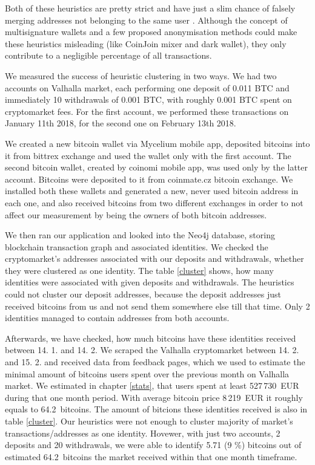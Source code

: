 \documentclass[
  digital, %
  table,   %
  lof,     %
  lot,     %
  oneside
]{fithesis3}
\begin{document}
Both of these heuristics are pretty strict and have just a slim chance of falsely merging
addresses not belonging to the same user \parencite{androulaki2013evaluating}.
Although the concept of multisignature wallets and a few proposed anonymisation methods could make
these heuristics misleading (like CoinJoin mixer and dark wallet), they only contribute to a 
negligible percentage of all transactions.

We measured the success of heuristic clustering in two ways.
We had two accounts on Valhalla market, each performing one deposit of 0.011 BTC and immediately 10 withdrawals of
0.001 BTC, with roughly 0.001 BTC spent on cryptomarket fees.
For the first account, we performed these transactions on January 11th 2018, for the second one on February 13th 2018.

We created a new bitcoin wallet via Mycelium mobile app, deposited bitcoins into it
from bittrex exchange and used the wallet only with the first account.
The second bitcoin wallet, created by coinomi mobile app, was used only by the latter account. 
Bitcoins were deposited to it from coinmate.cz bitcoin exchange.
We installed both these wallets and generated a new, never used bitcoin address in each one, and also
received bitcoins from two different exchanges in order to not affect
our measurement by being the owners of both bitcoin addresses.

We then ran our application and looked into the Neo4j database, storing
blockchain transaction graph and associated identities.
We checked the cryptomarket's addresses associated with our deposits and withdrawals,
whether they were clustered as one identity. The table \ref{cluster} shows, how many identities
were associated with given deposits and withdrawals. The heuristics could not cluster our
deposit addresses, because the deposit addresses just received bitcoins from us and not send them
somewhere else till that time. Only 2 identities managed to contain addresses from both accounts.

Afterwards, we have checked, how much bitcoins have these
identities received between 14. 1. and 14. 2. We scraped the Valhalla cryptomarket between 14. 2. and 15. 2.
and received data from feedback pages, which we used to estimate 
the minimal amount of bitcoins users spent over the previous month on Valhalla market.
We estimated in chapter \ref{stats}, that users spent at least 527\,730~EUR during that one month period.
With average bitcoin price 8\,219~EUR it roughly equals to 64.2~bitcoins.
The amount of bitcions these identities received is also in table \ref{cluster}.
Our heuristics were not enough to cluster majority of market's transactions/addresses as one identity.
Hovewer, with just two accounts, 2 deposits and 20 withdrawals, we were able to identify 5.71 (9 \%) bitcoins out of estimated
\mbox{64.2~bitcoins} the market received within that one month timeframe.
\end{document}
